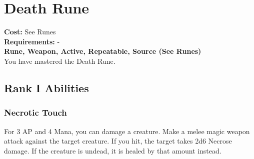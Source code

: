 \section{Death Rune}\label{rune:death}
\textbf{Cost:} See Runes\\
\textbf{Requirements:} -\\
\textbf{Rune, Weapon, Active, Repeatable, Source (See Runes)}\\
You have mastered the Death Rune.

\subsection{Rank I Abilities}

\subsubsection{Necrotic Touch}
For 3 AP and 4 Mana, you can damage a creature.
Make a melee magic weapon attack against the target creature.
If you hit, the target takes 2d6 Necrose damage.
If the creature is undead, it is healed by that amount instead.